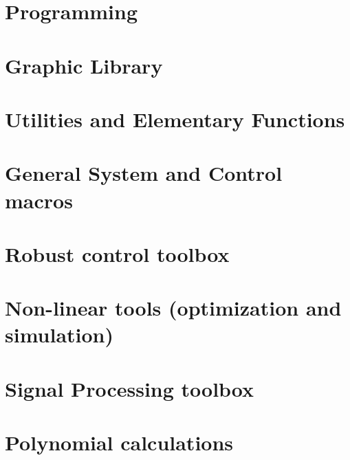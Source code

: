              \textheight=660pt 
             \textwidth=15cm
             \topmargin=-27pt 
             \oddsidemargin=0.7cm
             \evensidemargin=0.7cm
             \marginparwidth=60pt
\def\vector#1{\left( \begin{array}{c} #1  \end{array}\right)}
\def\matrixq#1{\left( \begin{array}{cc} #1  \end{array}\right)}

\makeindex 

%





\chapter{Programming}
         
\chapter{Graphic Library }
         
\chapter{Utilities and Elementary Functions}
         
\chapter{General System and Control macros}
         
\chapter{Robust control toolbox}
         
\chapter{Non-linear tools (optimization and simulation) }
         
\chapter{Signal Processing toolbox}
         
        
\chapter{Polynomial calculations}
        
